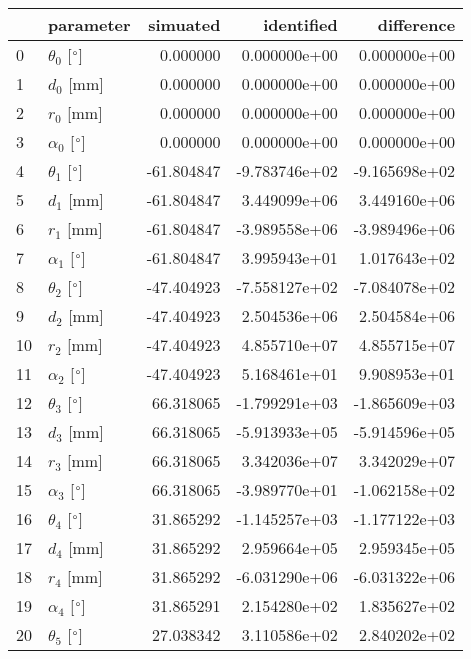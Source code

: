 \documentclass{standalone}%
\begin{document}
%
\normalsize%
\begin{tabular}{llrrr}
\toprule
{} &                 parameter &   simuated &    identified &    difference \\
\midrule
0  &  $\theta_{0}$ [$\degree$] &   0.000000 &  0.000000e+00 &  0.000000e+00 \\
1  &              $d_{0}$ [mm] &   0.000000 &  0.000000e+00 &  0.000000e+00 \\
2  &              $r_{0}$ [mm] &   0.000000 &  0.000000e+00 &  0.000000e+00 \\
3  &  $\alpha_{0}$ [$\degree$] &   0.000000 &  0.000000e+00 &  0.000000e+00 \\
4  &  $\theta_{1}$ [$\degree$] & -61.804847 & -9.783746e+02 & -9.165698e+02 \\
5  &              $d_{1}$ [mm] & -61.804847 &  3.449099e+06 &  3.449160e+06 \\
6  &              $r_{1}$ [mm] & -61.804847 & -3.989558e+06 & -3.989496e+06 \\
7  &  $\alpha_{1}$ [$\degree$] & -61.804847 &  3.995943e+01 &  1.017643e+02 \\
8  &  $\theta_{2}$ [$\degree$] & -47.404923 & -7.558127e+02 & -7.084078e+02 \\
9  &              $d_{2}$ [mm] & -47.404923 &  2.504536e+06 &  2.504584e+06 \\
10 &              $r_{2}$ [mm] & -47.404923 &  4.855710e+07 &  4.855715e+07 \\
11 &  $\alpha_{2}$ [$\degree$] & -47.404923 &  5.168461e+01 &  9.908953e+01 \\
12 &  $\theta_{3}$ [$\degree$] &  66.318065 & -1.799291e+03 & -1.865609e+03 \\
13 &              $d_{3}$ [mm] &  66.318065 & -5.913933e+05 & -5.914596e+05 \\
14 &              $r_{3}$ [mm] &  66.318065 &  3.342036e+07 &  3.342029e+07 \\
15 &  $\alpha_{3}$ [$\degree$] &  66.318065 & -3.989770e+01 & -1.062158e+02 \\
16 &  $\theta_{4}$ [$\degree$] &  31.865292 & -1.145257e+03 & -1.177122e+03 \\
17 &              $d_{4}$ [mm] &  31.865292 &  2.959664e+05 &  2.959345e+05 \\
18 &              $r_{4}$ [mm] &  31.865292 & -6.031290e+06 & -6.031322e+06 \\
19 &  $\alpha_{4}$ [$\degree$] &  31.865291 &  2.154280e+02 &  1.835627e+02 \\
20 &  $\theta_{5}$ [$\degree$] &  27.038342 &  3.110586e+02 &  2.840202e+02 \\

\end{tabular}
\end{document}
